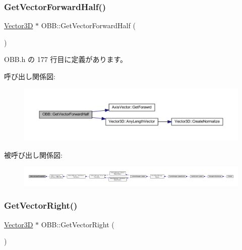 \subsubsection{\texorpdfstring{Get\+Vector\+Forward\+Half()}{GetVectorForwardHalf()}}
{\footnotesize\ttfamily \mbox{\hyperlink{class_vector3_d}{Vector3D}} $\ast$ O\+B\+B\+::\+Get\+Vector\+Forward\+Half (\begin{DoxyParamCaption}{ }\end{DoxyParamCaption})\hspace{0.3cm}{\ttfamily [inline]}}



 O\+B\+B.\+h の 177 行目に定義があります。

呼び出し関係図\+:\nopagebreak
\begin{figure}[H]
\begin{center}
\leavevmode
\includegraphics[width=350pt]{class_o_b_b_a03218b64dad1985876e7bad09f4a61ce_cgraph}
\end{center}
\end{figure}
被呼び出し関係図\+:
\nopagebreak
\begin{figure}[H]
\begin{center}
\leavevmode
\includegraphics[width=350pt]{class_o_b_b_a03218b64dad1985876e7bad09f4a61ce_icgraph}
\end{center}
\end{figure}
\mbox{\label{class_o_b_b_ace28639ea3a6c38d994d82d0dd40496e}} 
\subsubsection{\texorpdfstring{Get\+Vector\+Right()}{GetVectorRight()}}
{\footnotesize\ttfamily \mbox{\hyperlink{class_vector3_d}{Vector3D}} $\ast$ O\+B\+B\+::\+Get\+Vector\+Right (\begin{DoxyParamCaption}{ }\end{DoxyParamCaption})\hspace{0.3cm}{\ttfamily [inline]}}



